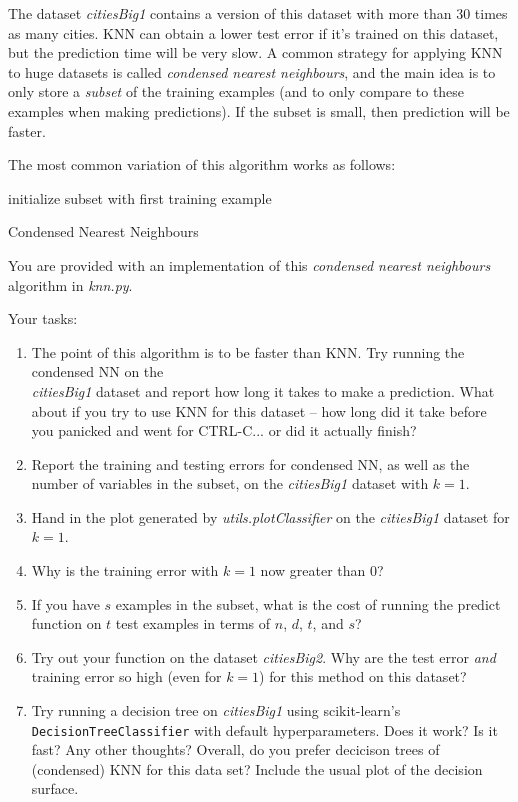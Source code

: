 \documentclass{article}
\def\blu#1{{\color{blu}#1}}
\def\enum#1{\begin{enumerate}#1\end{enumerate}}
\begin{document}
The dataset \emph{citiesBig1} contains a version of this dataset with more than 30 times as many cities. KNN can obtain a lower test error if it's trained on this dataset, but the prediction time will be very slow.
A common strategy for applying KNN to huge datasets is called \emph{condensed nearest neighbours}, and the main idea is to only store a \emph{subset}
of the training examples (and to only compare to these examples when making predictions). If the subset is small, then prediction will be faster.

The most common variation of this algorithm works as follows:

\begin{algorithm}[H]
 initialize subset with first training example\;
 \caption{Condensed Nearest Neighbours}
\end{algorithm}

You are provided with an implementation of this \emph{condensed nearest neighbours} algorithm in \emph{knn.py}.

Your tasks:

\blu{
\enum{
\item The point of this algorithm is to be faster than KNN. Try running the condensed NN on the\\\emph{citiesBig1} dataset and report how long it takes to make a prediction. What about if you try to use KNN for this dataset -- how long did it take before you panicked and went for CTRL-C... or did it actually finish?
\item Report the training and testing errors for condensed NN, as well as the number of variables in the subset, on the \emph{citiesBig1} dataset with $k=1$.
\item Hand in the plot generated by \emph{utils.plotClassifier} on the \emph{citiesBig1} dataset for $k=1$.
\item Why is the training error with $k=1$ now greater than $0$?
\item If you have $s$ examples in the subset, what is the cost of running the predict function on $t$ test examples in terms of $n$, $d$, $t$, and $s$?
\item Try out your function on the dataset \emph{citiesBig2}. Why are the  test error \emph{and} training error so high (even for $k=1$) for this method on this dataset?
\item Try running a decision tree on \emph{citiesBig1} using scikit-learn's \texttt{DecisionTreeClassifier} with default hyperparameters. Does it work? Is it fast? Any other thoughts? Overall, do you prefer decicison trees of (condensed) KNN for this data set? Include the usual plot of the decision surface.
}
}
\end{document}
